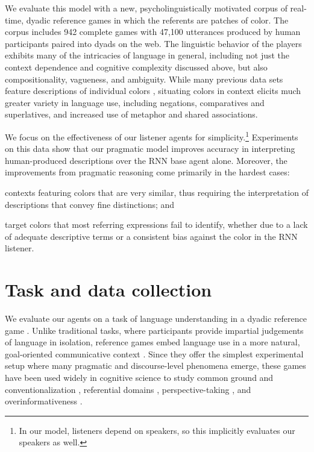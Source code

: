\documentclass[11pt,letterpaper]{article}
\renewcommand{\|}{\mid}
\begin{document}
We evaluate this model with a new, psycholinguistically motivated corpus of real-time, dyadic reference games in which
the referents are patches of color. 
The corpus includes 942 complete games with 47,100 utterances produced by
human participants paired into dyads on the web. The linguistic
behavior of the players exhibits many of the intricacies of language
in general, including not just the context dependence and cognitive
complexity discussed above, but also compositionality, vagueness, and
ambiguity. While many previous data sets feature descriptions of
individual colors \cite{Cook2005,Munroe2010,Kawakami2016}, situating
colors in context elicits much greater variety in language use,
including negations, comparatives and superlatives, and increased use
of metaphor and shared associations.

We focus on the effectiveness of
our listener agents for simplicity.\footnote{In our model, listeners depend on
speakers, so this implicitly evaluates our speakers as well.} Experiments on this data show that our pragmatic model improves accuracy
in interpreting human-produced descriptions over the RNN base agent
alone. Moreover, the improvements from pragmatic reasoning come primarily
in the hardest cases:
%
\begin{enumerate*}[label=(\arabic*)]
\item contexts featuring colors that are very similar, thus requiring
  the interpretation of descriptions that convey fine distinctions;
  and
\item target colors that most referring expressions fail to identify,
  whether due to a lack of adequate descriptive terms or a consistent
  bias against the color in the RNN listener.
\end{enumerate*}


\section{Task and data collection}\label{sec:corpus}

We evaluate our agents on a task of language understanding in a dyadic reference
game \cite{Rosenberg:Cohen:1964,KraussWeinheimer64_ReferencePhrases,Paetzel-etal:2014}. Unlike traditional tasks, where participants provide impartial judgements of language in isolation, reference games embed language use in a more natural, goal-oriented communicative context \cite{Clark96,TanenhausBrownSchmidt08_LanguageNatural}. Since they offer the simplest experimental setup where many pragmatic and discourse-level phenomena emerge, these games have been used widely in cognitive science to study common ground and conventionalization \cite{Clark:Wilkes-Gibbs:1986}, referential domains \cite{BrownSchmidtTanenhaus08_TargetedGame}, perspective-taking \cite{HannaTanenhausTrueswell03_CommonGroundPerspective}, and overinformativeness \cite{KoolenGattGoudbeekKrahmer11_Overspecification}.
\end{document}
